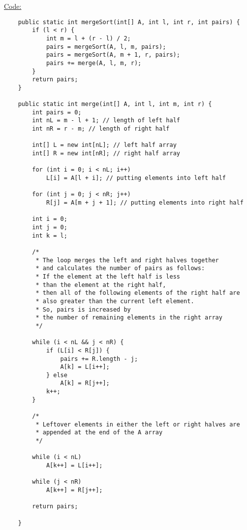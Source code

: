 \documentclass[12pt,letterpaper,final]{report}
\begin{document}

\bigskip

\underline{Code:}
\lstset{language=Java}
\begin{lstlisting}
    public static int mergeSort(int[] A, int l, int r, int pairs) {
        if (l < r) {
            int m = l + (r - l) / 2;
            pairs = mergeSort(A, l, m, pairs);
            pairs = mergeSort(A, m + 1, r, pairs);
            pairs += merge(A, l, m, r);
        }
        return pairs;
    }

    public static int merge(int[] A, int l, int m, int r) {
        int pairs = 0;
        int nL = m - l + 1; // length of left half
        int nR = r - m; // length of right half

        int[] L = new int[nL]; // left half array
        int[] R = new int[nR]; // right half array

        for (int i = 0; i < nL; i++)
            L[i] = A[l + i]; // putting elements into left half

        for (int j = 0; j < nR; j++)
            R[j] = A[m + j + 1]; // putting elements into right half

        int i = 0;
        int j = 0;
        int k = l;

        /*
         * The loop merges the left and right halves together
         * and calculates the number of pairs as follows:
         * If the element at the left half is less 
         * than the element at the right half,
         * then all of the following elements of the right half are
         * also greater than the current left element. 
         * So, pairs is increased by 
         * the number of remaining elements in the right array
         */

        while (i < nL && j < nR) {
            if (L[i] < R[j]) {
                pairs += R.length - j;
                A[k] = L[i++];
            } else
                A[k] = R[j++];
            k++;
        }

        /*
         * Leftover elements in either the left or right halves are
         * appended at the end of the A array
         */

        while (i < nL)
            A[k++] = L[i++];

        while (j < nR)
            A[k++] = R[j++];

        return pairs;

    }  
\end{lstlisting}
\bigskip
\end{document}
